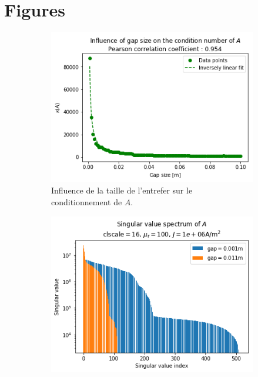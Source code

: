 \documentclass[11pt]{article}
\begin{document}
\section{Figures}
\begin{figure}[H]
	\centering
	\begin{subfigure}{0.24\textwidth}
		\centering
		\includegraphics[width=\linewidth]{gapcond.png}
		\caption{Influence de la taille de l'entrefer sur le  conditionnement de $A$.}
		\label{fig:gapcond}
	\end{subfigure}\hfill
	\begin{subfigure}{0.24\textwidth}
		\centering
		\includegraphics[width=\linewidth]{gapspec.png}

\end{subfigure}
\end{figure}
\end{document}
